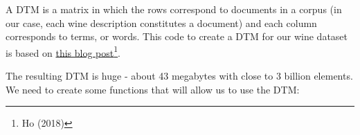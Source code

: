 \documentclass[12pt,twoside]{amherstthesis}
\newenvironment{Shaded}{\begin{snugshade}}{\end{snugshade}}
\newcommand{\KeywordTok}[1]{\textcolor[rgb]{0.13,0.29,0.53}{\textbf{#1}}}
\newcommand{\DataTypeTok}[1]{\textcolor[rgb]{0.13,0.29,0.53}{#1}}
\newcommand{\DecValTok}[1]{\textcolor[rgb]{0.00,0.00,0.81}{#1}}
\newcommand{\StringTok}[1]{\textcolor[rgb]{0.31,0.60,0.02}{#1}}
\newcommand{\CommentTok}[1]{\textcolor[rgb]{0.56,0.35,0.01}{\textit{#1}}}
\newcommand{\OtherTok}[1]{\textcolor[rgb]{0.56,0.35,0.01}{#1}}
\newcommand{\ControlFlowTok}[1]{\textcolor[rgb]{0.13,0.29,0.53}{\textbf{#1}}}
\newcommand{\OperatorTok}[1]{\textcolor[rgb]{0.81,0.36,0.00}{\textbf{#1}}}
\newcommand{\NormalTok}[1]{#1}
\begin{document}
A DTM is a matrix in which the rows correspond to documents in a corpus
(in our case, each wine description constitutes a document) and each
column corresponds to terms, or words. This code to create a DTM for our
wine dataset is based on
\href{https://datawarrior.wordpress.com/2018/01/22/document-term-matrix-text-mining-in-r-and-python/}{this
blog post}\footnote{Ho (2018)}.
\begin{Shaded}
\end{Shaded}
The resulting DTM is huge - about 43 megabytes with close to 3 billion
elements. We need to create some functions that will allow us to use the
DTM:
\begin{Shaded}
\end{Shaded}
\end{document}
